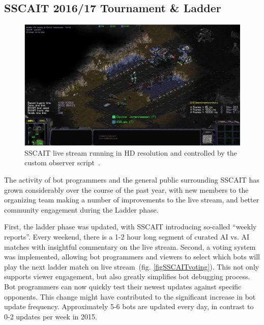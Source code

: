 \subsection{SSCAIT 2016/17 Tournament \& Ladder}\label{subsecSSCAITnews}

\begin{figure}[t]
  \centering
  \includegraphics[width=1\columnwidth]{fig/sscait-stream.png}
  \caption{SSCAIT live stream running in HD resolution and controlled by the custom observer script~\cite{mattsson2015automatic}.}
  \label{figSSCAITstream}
\end{figure}

The activity of bot programmers and the general public surrounding SSCAIT has grown considerably over the course of the past year, with new members to the organizing team making a number of improvements to the live stream, and better community engagement during the Ladder phase.

First, the ladder phase was updated, with SSCAIT introducing so-called ``weekly reports''. Every weekend, there is a 1-2 hour long segment of curated AI vs. AI matches with insightful commentary on the live stream. Second, a voting system was implemented, allowing bot programmers and viewers to select which bots will play the next ladder match on live stream~(fig. \ref{figSSCAITvoting}). This not only supports viewer engagement, but also greatly simplifies bot debugging process. Bot programmers can now quickly test their newest updates against specific opponents. This change might have contributed to the significant increase in bot update frequency. Approximately 5-6 bots are updated every day, in contrast to 0-2 updates per week in 2015.


